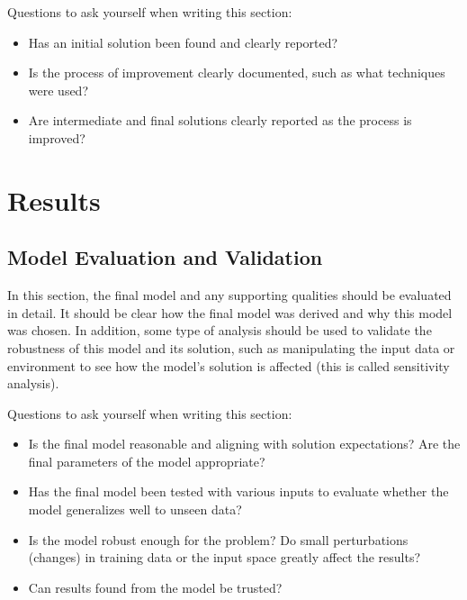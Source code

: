 \documentclass[twoside,openright,titlepage,numbers=noenddot,headinclude,%
               footinclude=true,cleardoublepage=empty,abstractoff,BCOR=5mm,%
               paper=a4,fontsize=11pt,ngerman,american]{scrreprt}
\numberwithin{theorem}{chapter}
\numberwithin{definition}{chapter}
\numberwithin{algorithm}{chapter}
\numberwithin{figure}{chapter}
\numberwithin{table}{chapter}
\numberwithin{equation}{chapter}
\begin{document}
\begin{itemize}
Questions to ask yourself when writing this section:
\begin{itemize}%
\item Has an initial solution been found and clearly reported?
\item Is the process of improvement clearly documented, such as what techniques were used?
\item Are intermediate and final solutions clearly reported as the process is improved?
\end{itemize}

\chapter*{Results}


\section*{Model Evaluation and Validation}
In this section, the final model and any supporting qualities should be evaluated in detail. It should be clear how the final model was derived and why this model was chosen. In addition, some type of analysis should be used to validate the robustness of this model and its solution, such as manipulating the input data or environment to see how the model’s solution is affected (this is called sensitivity analysis). 


Questions to ask yourself when writing this section:
\begin{itemize}%
\item Is the final model reasonable and aligning with solution expectations? Are the final parameters of the model appropriate?
\item Has the final model been tested with various inputs to evaluate whether the model generalizes well to unseen data?
\item Is the model robust enough for the problem? Do small perturbations (changes) in training data or the input space greatly affect the results?
\item Can results found from the model be trusted?
\end{itemize}


\end{itemize}
\end{document}
